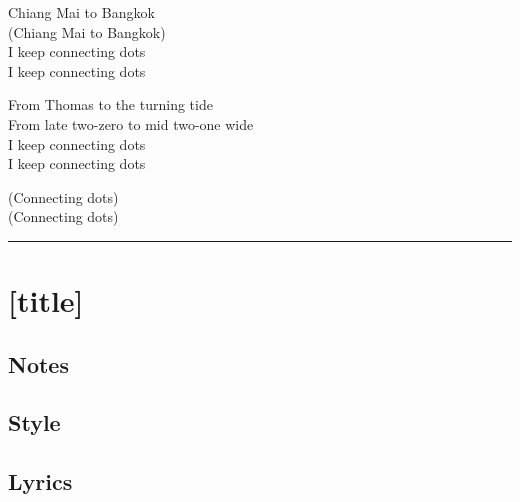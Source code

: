 \documentclass[]{article}
\begin{document}
Chiang Mai to Bangkok\\
(Chiang Mai to Bangkok)\\
I keep connecting dots\\
I keep connecting dots

From Thomas to the turning tide\\
From late two-zero to mid two-one wide\\
I keep connecting dots\\
I keep connecting dots

(Connecting dots)\\
(Connecting dots)

\begin{center}\rule{0.5\linewidth}{0.5pt}\end{center}

\section{{[}title{]}}\label{title}

\subsection{Notes}\label{notes-50}

\subsection{Style}\label{style-50}

\subsection{Lyrics}\label{lyrics-50}
\end{document}
